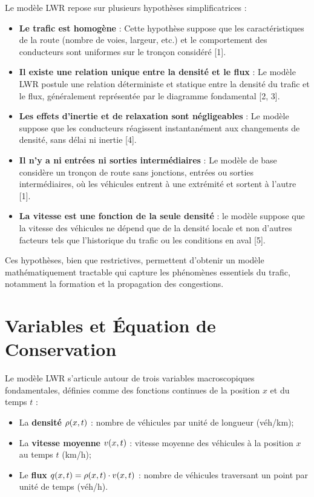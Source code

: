     Le modèle LWR repose sur plusieurs hypothèses simplificatrices :
    
    \begin{itemize}
        \item \textbf{Le trafic est homogène} : Cette hypothèse suppose que les caractéristiques de la route (nombre de voies, largeur, etc.) et le comportement des conducteurs sont uniformes sur le tronçon considéré [1].
        \item \textbf{Il existe une relation unique entre la densité et le flux} : Le modèle LWR postule une relation déterministe et statique entre la densité du trafic et le flux, généralement représentée par le diagramme fondamental [2, 3].
        \item \textbf{Les effets d'inertie et de relaxation sont négligeables} : Le modèle suppose que les conducteurs réagissent instantanément aux changements de densité, sans délai ni inertie [4].
        \item \textbf{Il n'y a ni entrées ni sorties intermédiaires} : Le modèle de base considère un tronçon de route sans jonctions, entrées ou sorties intermédiaires, où les véhicules entrent à une extrémité et sortent à l'autre [1].
        \item \textbf{La vitesse est une fonction de la seule densité} : le modèle suppose que la vitesse des véhicules ne dépend que de la densité locale et non d'autres facteurs tels que l'historique du trafic ou les conditions en aval [5].
    \end{itemize}

Ces hypothèses, bien que restrictives, permettent d'obtenir un modèle mathématiquement tractable qui capture les phénomènes essentiels du trafic, notamment la formation et la propagation des congestions.

\section{Variables et Équation de Conservation}
\label{sec:equation_conservation}

Le modèle LWR s'articule autour de trois variables macroscopiques fondamentales, définies comme des fonctions continues de la position $x$ et du temps $t$ :

\begin{definition}
\begin{itemize}
\item La \textbf{densité} $\rho(x,t)$ : nombre de véhicules par unité de longueur (véh/km);
\item La \textbf{vitesse moyenne} $v(x,t)$ : vitesse moyenne des véhicules à la position $x$ au temps $t$ (km/h);
\item Le \textbf{flux} $q(x,t) = \rho(x,t) \cdot v(x,t)$ : nombre de véhicules traversant un point par unité de temps (véh/h).
\end{itemize}
\end{definition}

